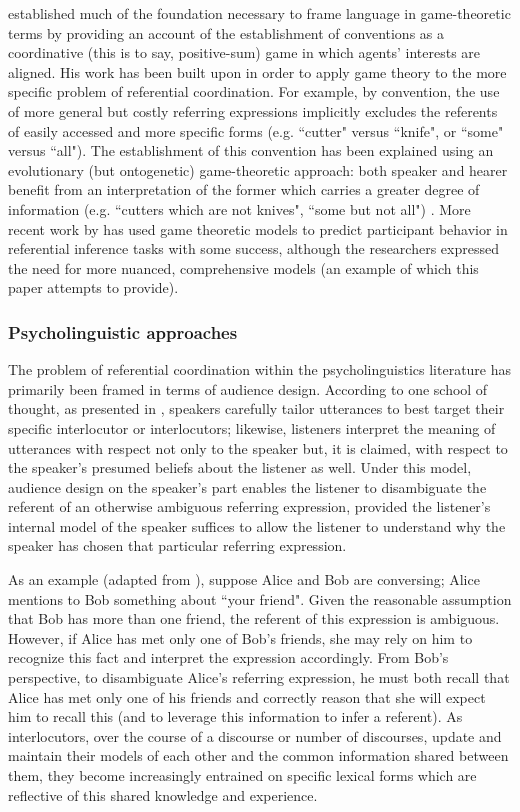 \documentclass[11pt]{article}
\begin{document}
\cite{lewis1969} established much of the foundation necessary to frame language in game-theoretic terms by  providing an account of the establishment of conventions as a coordinative (this is to say, positive-sum) game in which agents' interests are aligned. His work has been built upon in order to apply game theory to the more specific problem of referential coordination. For example, by convention, the use of more general but costly referring expressions implicitly excludes the referents of easily accessed and more specific forms (e.g. ``cutter" versus ``knife", or ``some" versus ``all"). The establishment of this convention has been explained using an evolutionary (but ontogenetic) game-theoretic approach: both speaker and hearer benefit from an interpretation of the former which carries a greater degree of information (e.g. ``cutters which are not knives", ``some but not all") \citep{benz2005}. More recent work by \cite{degen2012} has used game theoretic models to predict participant behavior in referential inference tasks with some success, although the researchers expressed the need for more nuanced, comprehensive models (an example of which this paper attempts to provide). 

\subsubsection{Psycholinguistic approaches}
The problem of referential coordination within the psycholinguistics literature has primarily been framed in terms of audience design. According to one school of thought, as presented in \cite{clark1982}, speakers carefully tailor utterances to best target their specific interlocutor or interlocutors; likewise, listeners interpret the meaning of utterances with respect not only to the speaker but, it is claimed, with respect to the speaker's presumed beliefs about the listener as well. Under this model, audience design on the speaker's part enables the listener to disambiguate the referent of an otherwise ambiguous referring expression, provided the listener's internal model of the speaker suffices to allow the listener to understand why the speaker has chosen that particular referring expression. 

As an example (adapted from \citeauthor{clark1982}), suppose Alice and Bob are conversing; Alice mentions to Bob something about ``your friend". Given the reasonable assumption that Bob has more than one friend, the referent of this expression is ambiguous. However, if Alice has met only one of Bob's friends, she may rely on him to recognize this fact and interpret the expression accordingly. From Bob's perspective, to disambiguate Alice's referring expression, he must both recall that Alice has met only one of his friends and  correctly reason that she will expect him to recall this (and to leverage this information to infer a referent). As interlocutors, over the course of a discourse or number of discourses, update and maintain their models of each other and the common information shared between them, they become increasingly entrained on specific lexical forms which are reflective of this shared knowledge and experience.
\end{document}

